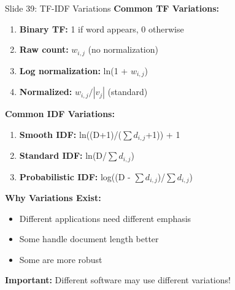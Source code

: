 \documentclass[8pt]{beamer}
\begin{document}
	\begin{frame}{Slide 39: TF-IDF Variations}
		\fontsize{6.5}{7.5}\selectfont
		\textbf{Common TF Variations:}
		\begin{enumerate}
			\item \textbf{Binary TF:} 1 if word appears, 0 otherwise
			\item \textbf{Raw count:} $w_{i,j}$ (no normalization)
			\item \textbf{Log normalization:} ln(1 + $w_{i,j}$)
			\item \textbf{Normalized:} $w_{i,j} / |v_j|$ (standard)
		\end{enumerate}
		
		\vspace{0.1cm}
		\textbf{Common IDF Variations:}
		\begin{enumerate}
			\item \textbf{Smooth IDF:} ln((D+1)/($\sum d_{i,j}$+1)) + 1
			\item \textbf{Standard IDF:} ln(D/$\sum d_{i,j}$)
			\item \textbf{Probabilistic IDF:} log((D - $\sum d_{i,j}$)/$\sum d_{i,j}$)
		\end{enumerate}
		
		\vspace{0.1cm}
		\textbf{Why Variations Exist:}
		\begin{itemize}
			\item Different applications need different emphasis
			\item Some handle document length better
			\item Some are more robust
		\end{itemize}
		
		\textcolor{myblue}{\textbf{Important:}} Different software may use different variations!
	\end{frame}
	
\end{document}
